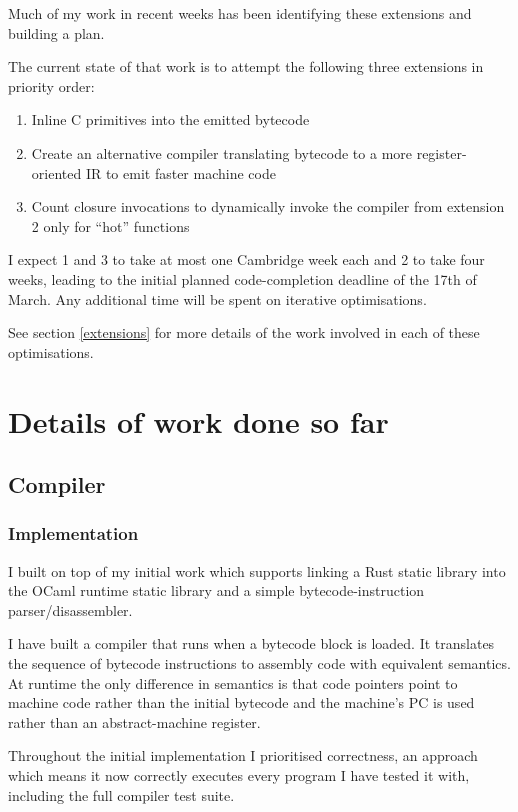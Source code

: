 \documentclass[12pt,a4paper, headings=standardclasses, parskip=on]{scrartcl}
\begin{document}
Much of my work in recent weeks has been identifying these extensions and building a plan.

The current state of that work is to attempt the following three extensions in priority order:

\begin{enumerate}
      \item Inline C primitives into the emitted bytecode 
      \item Create an alternative compiler translating bytecode to a more
            register-oriented IR to emit faster machine code
      \item Count closure invocations to dynamically invoke the compiler from
            extension 2 only for ``hot'' functions
\end{enumerate}

I expect 1 and 3 to take at most one Cambridge week each and 2 to take four weeks,
leading to the initial planned code-completion deadline of the 17th of March.
Any additional time will be spent on iterative optimisations.

See section \ref{extensions} for more details of the work involved in each of these optimisations.

\section{Details of work done so far} \label{details}

\subsection{Compiler}

\subsubsection*{Implementation}

I built on top of my initial work which supports linking a Rust static library into the OCaml runtime
static library and a simple bytecode-instruction parser/disassembler.

I have built a compiler that runs when a bytecode block is loaded. It
translates the sequence of bytecode instructions to assembly code with
equivalent semantics. At runtime the only difference in semantics is that
code pointers point to machine code rather than the initial bytecode and
the machine's PC is used rather than an abstract-machine register.

Throughout the initial implementation I prioritised correctness, an approach
which means it now correctly executes every program I have tested it with, including
the full compiler test suite.
\end{document}
